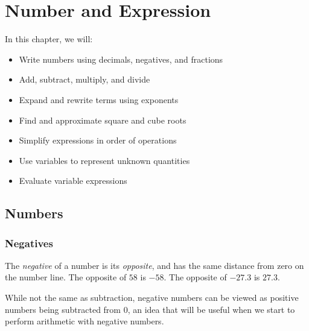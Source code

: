 \chapter{Number and Expression}

\begin{summary}
In this chapter, we will:
\begin{itemize}
    \item Write numbers using decimals, negatives, and fractions
    \item Add, subtract, multiply, and divide
    \item Expand and rewrite terms using exponents
    \item Find and approximate square and cube roots
    \item Simplify expressions in order of operations 
    \item Use variables to represent unknown quantities
    \item Evaluate variable expressions
    
\end{itemize}
\end{summary}

\newpage 
\section{Numbers}



\subsection{Negatives}
\begin{definition}[Negative]
The \emph{negative} of a number is its \emph{opposite}, and has the same distance from zero on the number line.  The opposite of \(58\) is \(-58\).  The opposite of \(-27.3\) is \(27.3\).  
\end{definition}

While not the same as subtraction, negative numbers can be viewed as positive numbers being subtracted from \(0\), an idea that will be useful when we start to perform arithmetic with negative numbers.  

